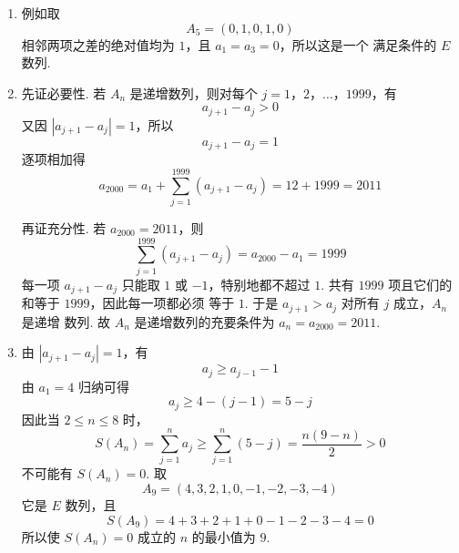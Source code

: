 \begin{solution}
\begin{enumerate}
\item 例如取
\[
A_5=(0,1,0,1,0)
\]
相邻两项之差的绝对值均为 \(1\)，且 \(a_1=a_3=0\)，所以这是一个
满足条件的 \(E\) 数列.
\item 先证必要性. 若 \(A_n\) 是递增数列，则对每个
\(j=1\)，\(2\)，\(\ldots\)，\(1999\)，有
\[
a_{j+1}-a_j>0
\]
又因 \(\left|a_{j+1}-a_j\right|=1\)，所以
\[
a_{j+1}-a_j=1
\]
逐项相加得
\[
a_{2000}=a_1+\sum_{j=1}^{1999}(a_{j+1}-a_j)
=12+1999=2011
\]

再证充分性. 若 \(a_{2000}=2011\)，则
\[
\sum_{j=1}^{1999}(a_{j+1}-a_j)=a_{2000}-a_1=1999
\]
每一项 \(a_{j+1}-a_j\) 只能取 \(1\) 或 \(-1\)，特别地都不超过
\(1\). 共有 \(1999\) 项且它们的和等于 \(1999\)，因此每一项都必须
等于 \(1\). 于是 \(a_{j+1}>a_j\) 对所有 \(j\) 成立，\(A_n\) 是递增
数列. 故 \(A_n\) 是递增数列的充要条件为 \(a_n=a_{2000}=2011\).
\item 由 \(\left|a_{j+1}-a_j\right|=1\)，有
\[
a_j\geqslant a_{j-1}-1
\]
由 \(a_1=4\) 归纳可得
\[
a_j\geqslant4-(j-1)=5-j
\]
因此当 \(2\leqslant n\leqslant8\) 时，
\[
S(A_n)=\sum_{j=1}^{n}a_j
\geqslant\sum_{j=1}^{n}(5-j)
=\frac{n(9-n)}{2}>0
\]
不可能有 \(S(A_n)=0\). 取
\[
A_9=(4,3,2,1,0,-1,-2,-3,-4)
\]
它是 \(E\) 数列，且
\[
S(A_9)=4+3+2+1+0-1-2-3-4=0
\]
所以使 \(S(A_n)=0\) 成立的 \(n\) 的最小值为 \(9\).
\end{enumerate}
\end{solution}
